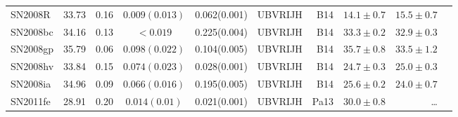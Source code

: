 \begin{table*}
\begin{minipage}{70mm}
\begin{center}
\begin{tabular}{llccccrrrr}
SN2008R  & 33.73 & 0.16 & $0.009(0.013)$ & 0.062(0.001) & UBVRIJH & B14	& $14.1 \pm 0.7$ & $15.5 \pm 0.7$\\
SN2008bc & 34.16 & 0.13 & $<0.019$ 	& 0.225(0.004) & UBVRIJH & B14	& $33.3 \pm 0.2$ & $32.9 \pm 0.3$\\
SN2008gp & 35.79 & 0.06 & $0.098(0.022)$ & 0.104(0.005) & UBVRIJH & B14	& $35.7 \pm 0.8$ & $33.5 \pm 1.2$\\
SN2008hv & 33.84 & 0.15 & $0.074(0.023)$ & 0.028(0.001) & UBVRIJH & B14	& $24.7 \pm 0.3$ & $25.0 \pm 0.3$ \\
SN2008ia & 34.96 & 0.09 & $0.066(0.016)$ & 0.195(0.005) & UBVRIJH & B14	& $25.6 \pm 0.2$ & $24.0 \pm 0.7$\\
SN2011fe & 28.91 & 0.20 & $0.014 (0.01)$ & 0.021(0.001) & UBVRIJH  & Pa13 & $30.0 \pm 0.8$ & \ldots\\
\hline
\end{tabular}
\label{tab:lr}
\end{center}
\end{minipage}
\end{table*}
